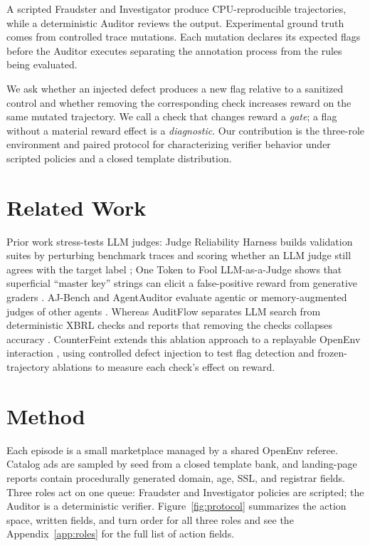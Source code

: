 \documentclass{article}
\begin{document}
A scripted Fraudster and Investigator produce CPU-reproducible trajectories, while a deterministic Auditor reviews the output. Experimental ground truth comes from controlled trace mutations. Each mutation declares its expected flags before the Auditor executes separating the annotation process from the rules being evaluated.

We ask whether an injected defect produces a new flag relative to a sanitized control and whether removing the corresponding check increases reward on the same mutated trajectory. We call a check that changes reward a \emph{gate}; a flag without a material reward effect is a \emph{diagnostic}. Our contribution is the three-role environment and paired protocol for characterizing verifier behavior under scripted policies and a closed template distribution.

\section{Related Work}
\label{sec:related}

Prior work stress-tests LLM judges: Judge Reliability Harness builds validation suites by perturbing benchmark traces and scoring whether an LLM judge still agrees with the target label \citep{dev2026jrh}; One Token to Fool LLM-as-a-Judge shows that superficial ``master key'' strings can elicit a false-positive reward from generative graders \citep{zhao2025onetoken}. AJ-Bench and AgentAuditor evaluate agentic or memory-augmented judges of other agents \citep{shi2026ajbench,luo2025agentauditor}. Whereas AuditFlow separates LLM search from deterministic XBRL checks and reports that removing the checks collapses accuracy \citep{wang2026auditflow}. CounterFeint extends this ablation approach to a replayable OpenEnv interaction \citep{openenv2026}, using controlled defect injection to test flag detection and frozen-trajectory ablations to measure each check's effect on reward.

\section{Method}
\label{sec:method}

Each episode is a small marketplace managed by a shared OpenEnv referee. Catalog ads are sampled by seed from a closed template bank, and landing-page reports contain procedurally generated domain, age, SSL, and registrar fields. Three roles act on one queue: Fraudster and Investigator policies are scripted; the Auditor is a deterministic verifier. Figure~\ref{fig:protocol} summarizes the action space, written fields, and turn order for all three roles and see the Appendix~\ref{app:roles} for the full list of action fields.
\end{document}
